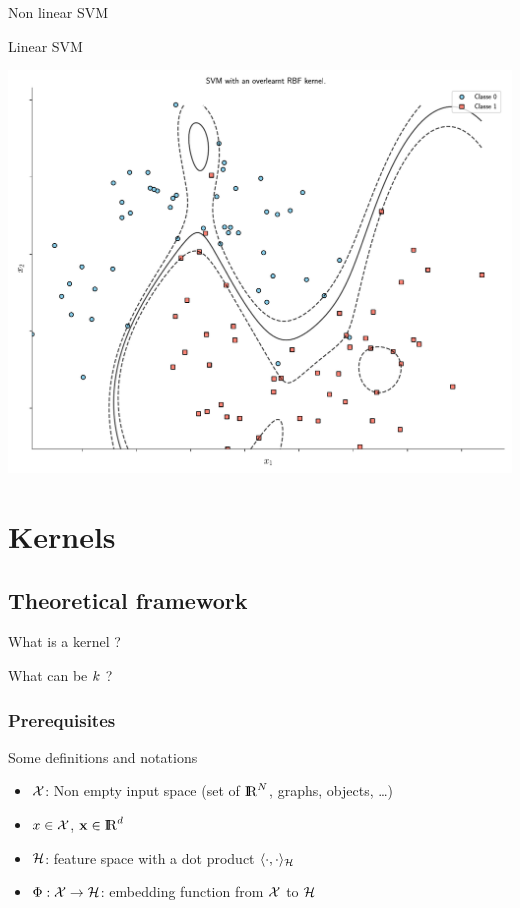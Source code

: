 \documentclass[11pt, pdf, compress, handout]{beamer}
\begin{document}
\begin{frame}{Non linear SVM}
  \begin{block}{Linear SVM}
    \begin{center}
          \includegraphics[width=.8\textwidth]{./figures/svm_rbf_overlearning.pdf}
    \end{center}
\end{block}

\end{frame}

\section{Kernels}
\subsection{Theoretical framework}
\begin{frame}[plain]
  \begin{center}
    {\Huge What is a kernel ?}
    
    \vspace{2cm}

    What can be ${\mathnormal{k}}$ ?
  \end{center}
  
\end{frame}

\begin{frame}
  \frametitle{Prerequisites}
  \begin{block}{Some definitions and notations}
    \begin{itemize}
    \item ${\mathcal{X}}$: Non empty input space (set of ${\mathrm{I\hskip-2.2pt R}}^N$, graphs,
      objects, \dots)
    \item ${\mathnormal{x}} \in {\mathcal{X}}$, ${\mathbf{x}} \in {\mathrm{I\hskip-2.2pt R}}^d$
    \item ${\mathcal{H}}$: feature space with a dot product
      $\langle \cdot, \cdot \rangle_{\mathcal{H}}$
    \item $\Phi : {\mathcal{X}} \to {\mathcal{H}}$: embedding function from ${\mathcal{X}}$ to
      ${\mathcal{H}}$
    \end{itemize}
  \end{block}
\end{frame}
\end{document}
